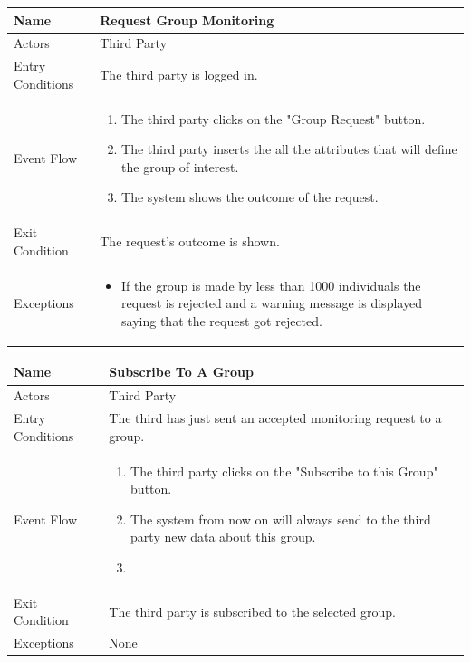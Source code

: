 \begin{enumerate}
\FloatBarrier
\begin{table}[h]
\begin{tabular}{|l|p{}|}
\hline
Name             & Request Group Monitoring \\ \hline
Actors           & Third Party  \\ \hline
Entry Conditions & The third party is logged in.    \\ \hline
Event Flow       & \begin{enumerate}
            \item The third party clicks on the "Group Request" button.
            \item The third party inserts the all the attributes that will define the group of interest.
            \item The system shows the outcome of the request. 
        \end{enumerate}\\ \hline
Exit Condition   & The request's outcome is shown.\\ \hline
Exceptions       & \begin{itemize}
\item If the group is made by less than 1000 individuals the request is rejected and a warning message is displayed saying that the request got rejected.
\end{itemize}\\ \hline
\end{tabular}
\end{table}
\FloatBarrier

\FloatBarrier
\begin{table}[h]
\begin{tabular}{|l|p{}|}
\hline
Name             & Subscribe To A Group\\ \hline
Actors           & Third Party  \\ \hline
Entry Conditions & The third has just sent an accepted monitoring request to a group. \\ \hline
Event Flow       & \begin{enumerate}
            \item The third party clicks on the "Subscribe to this Group" button.
            \item The system from now on will always send to the third party new data about this group.
            \item 
        \end{enumerate}\\ \hline
Exit Condition   & The third party is subscribed to the selected group.\\ \hline
Exceptions       & None \\ \hline
\end{tabular}
\end{table}
\FloatBarrier



\end{enumerate}
